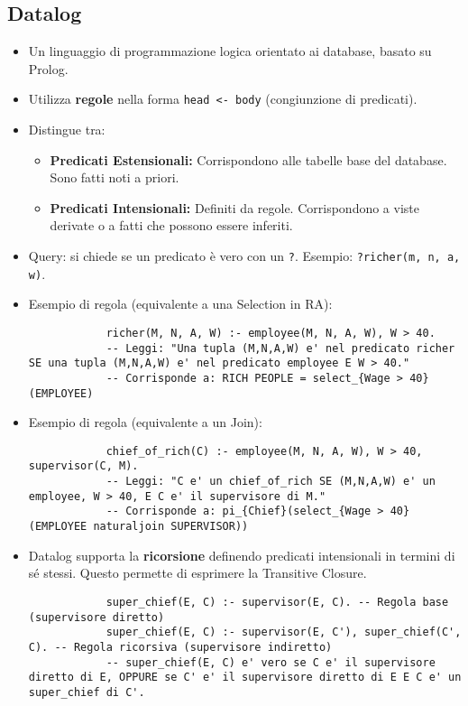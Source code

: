 \documentclass{article}
\begin{document}
	\subsection{Datalog}
	\begin{itemize}
		\item Un linguaggio di programmazione logica orientato ai database, basato su Prolog.
		\item Utilizza \textbf{regole} nella forma \texttt{head <- body} (congiunzione di predicati).
		\item Distingue tra:
		\begin{itemize}
			\item \textbf{Predicati Estensionali:} Corrispondono alle tabelle base del database. Sono fatti noti a priori.
			\item \textbf{Predicati Intensionali:} Definiti da regole. Corrispondono a viste derivate o a fatti che possono essere inferiti.
		\end{itemize}
		\item Query: si chiede se un predicato è vero con un \texttt{?}. Esempio: \texttt{?richer(m, n, a, w)}.
		\item Esempio di regola (equivalente a una Selection in RA):
		\begin{verbatim}
			richer(M, N, A, W) :- employee(M, N, A, W), W > 40.
			-- Leggi: "Una tupla (M,N,A,W) e' nel predicato richer SE una tupla (M,N,A,W) e' nel predicato employee E W > 40."
			-- Corrisponde a: RICH PEOPLE = select_{Wage > 40}(EMPLOYEE)
		\end{verbatim}
		\item Esempio di regola (equivalente a un Join):
		\begin{verbatim}
			chief_of_rich(C) :- employee(M, N, A, W), W > 40, supervisor(C, M).
			-- Leggi: "C e' un chief_of_rich SE (M,N,A,W) e' un employee, W > 40, E C e' il supervisore di M."
			-- Corrisponde a: pi_{Chief}(select_{Wage > 40}(EMPLOYEE naturaljoin SUPERVISOR))
		\end{verbatim}
		\item Datalog supporta la \textbf{ricorsione} definendo predicati intensionali in termini di sé stessi. Questo permette di esprimere la Transitive Closure.
		\begin{verbatim}
			super_chief(E, C) :- supervisor(E, C). -- Regola base (supervisore diretto)
			super_chief(E, C) :- supervisor(E, C'), super_chief(C', C). -- Regola ricorsiva (supervisore indiretto)
			-- super_chief(E, C) e' vero se C e' il supervisore diretto di E, OPPURE se C' e' il supervisore diretto di E E C e' un super_chief di C'.

\end{verbatim}
\end{itemize}
\end{document}

